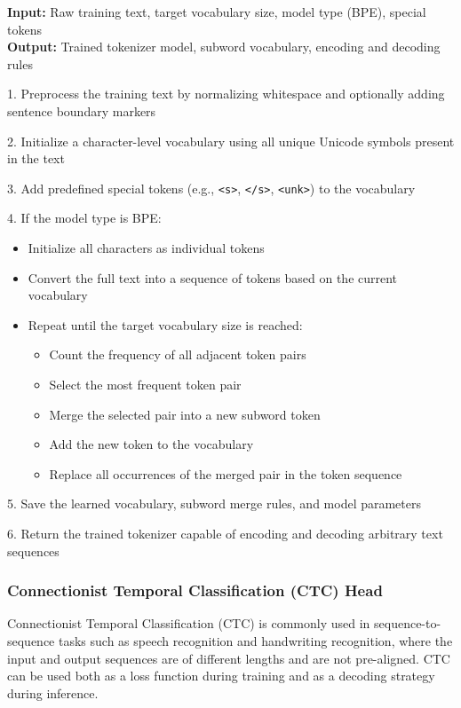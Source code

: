 \begin{algorithm}[H]
	\caption{Train SentencePiece Tokenizer (BPE)}
	
	\textbf{Input:} Raw training text, target vocabulary size, model type (BPE), special tokens \\
	\textbf{Output:} Trained tokenizer model, subword vocabulary, encoding and decoding rules
	
	1. Preprocess the training text by normalizing whitespace and optionally adding sentence boundary markers\;
	
	2. Initialize a character-level vocabulary using all unique Unicode symbols present in the text\;
	
	3. Add predefined special tokens (e.g., \texttt{<s>}, \texttt{</s>}, \texttt{<unk>}) to the vocabulary\;
	
	4. If the model type is BPE:
	\begin{itemize}
		\item Initialize all characters as individual tokens
		\item Convert the full text into a sequence of tokens based on the current vocabulary
		\item Repeat until the target vocabulary size is reached:
		\begin{itemize}
			\item Count the frequency of all adjacent token pairs
			\item Select the most frequent token pair
			\item Merge the selected pair into a new subword token
			\item Add the new token to the vocabulary
			\item Replace all occurrences of the merged pair in the token sequence
		\end{itemize}
	\end{itemize}
	
	5. Save the learned vocabulary, subword merge rules, and model parameters\;
	
	6. Return the trained tokenizer capable of encoding and decoding arbitrary text sequences\;
	
\end{algorithm}

\subsubsection{Connectionist Temporal Classification (CTC) Head}

Connectionist Temporal Classification (CTC) is commonly used in sequence-to-sequence
tasks such as speech recognition and handwriting recognition, where the input and
output sequences are of different lengths and are not pre-aligned. CTC can be used
both as a loss function during training and as a decoding strategy during inference.

